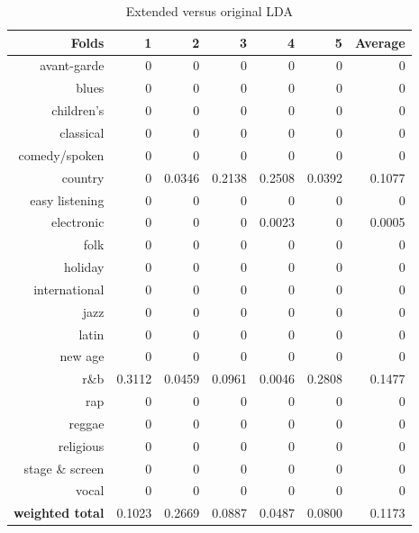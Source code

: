 \begin{table}[h]
\begin{subtable}[b]{0.8\textwidth}
\begin{tabular}{| r | r | r | r | r | r | r |}
\hline
\textbf{Folds} &  \textbf{1} & \textbf{2} & \textbf{3} & \textbf{4} & \textbf{5} & \textbf{Average}\\
\hline
avant-garde 	& 0 	& 0	 	& 0 	& 0 	& 0 	& 0\\
blues 			& 0 	& 0 	& 0 	& 0 	& 0 	& 0\\
children's 		& 0 	& 0 	& 0 	& 0 	& 0 	& 0\\
classical 		& 0 	& 0  	& 0 	& 0 	& 0 	& 0\\
comedy/spoken 	& 0 	& 0 	& 0 	& 0 	& 0	 	& 0 \\
country			& 0 	& 0.0346 & 0.2138 & 0.2508 	& 0.0392 & 0.1077 \\
easy listening 	& 0 	& 0 	& 0 	& 0 	& 0 	& 0 \\
electronic 		& 0 	& 0 	& 0 	& 0.0023 & 0 	& 0.0005\\
folk 			& 0 	& 0 	& 0 	& 0 	& 0 	& 0\\
holiday 		& 0 	& 0 	& 0 	& 0 	& 0 	& 0 \\
international 	& 0 	& 0 	& 0 	& 0 	& 0 	& 0\\
jazz 			& 0 	& 0 	& 0 	& 0 	& 0 	& 0 \\
latin 			& 0 	& 0 	& 0 	& 0 	& 0 	& 0\\
new age 		& 0 	& 0 	& 0 	& 0 	& 0 	& 0\\
r\&b 			& 0.3112 & 0.0459 & 0.0961 & 0.0046 & 0.2808 & 0.1477\\
rap 			& 0 	& 0 	& 0 	& 0 	& 0 	& 0\\
reggae 			& 0 	& 0 	& 0 	& 0 	& 0 	& 0\\
religious 		& 0 	& 0 	& 0 	& 0 	& 0 	& 0\\
stage \& screen & 0 	& 0 	& 0 	& 0 	& 0 	& 0\\
vocal 			& 0 	& 0 	& 0 	& 0 	& 0 	& 0\\
\hline
\textbf{weighted total} &  0.1023 & 0.2669 & 0.0887 & 0.0487 & 0.0800 & 0.1173\\
\hline
\end{tabular}
\caption{Original LDA - F1-score for 20 runs, 50 topics, alpha \& beta = 0.1, no poprock}
\end{subtable}
\caption{Extended versus original LDA}
\end{table}